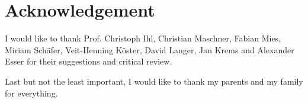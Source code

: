 
\section*{Acknowledgement}

\vspace{1cm}
\large
I would like to thank Prof. Christoph Ihl, Christian Maschner, Fabian Mies, Miriam Schäfer, Veit-Henning Köster, David Langer, Jan Krems and Alexander Esser for their suggestions and critical review.

Last but not the least important, I would like to thank my parents and my family for everything.

\normalsize
